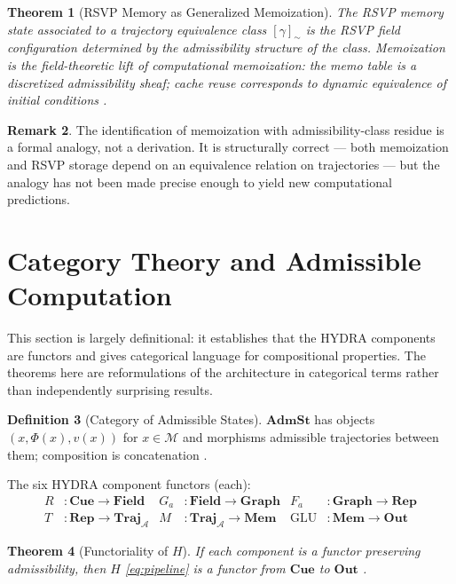 \documentclass[12pt, a4paper]{article}
\theoremstyle{rsvpstyle}
\newtheorem{theorem}{Theorem}[section]
\theoremstyle{definition}
\newtheorem{definition}[theorem]{Definition}
\newtheorem{remark}[theorem]{Remark}
\newcommand{\OpMan}{\mathcal{M}}
\newcommand{\Adm}{\mathcal{A}}
\begin{document}
\begin{theorem}[RSVP Memory as Generalized Memoization]
The RSVP memory state associated to a trajectory equivalence class $[\gamma]_\sim$
is the RSVP field configuration determined by the admissibility structure of
the class. Memoization is the field-theoretic lift of computational memoization:
the memo table is a discretized admissibility sheaf; cache reuse corresponds
to dynamic equivalence of initial conditions \citep{Bellman1957}.
\end{theorem}

\begin{remark}
The identification of memoization with admissibility-class
residue is a formal analogy, not a derivation. It is structurally correct ---
both memoization and RSVP storage depend on an equivalence relation on
trajectories --- but the analogy has not been made precise enough to yield
new computational predictions.
\end{remark}

\section{Category Theory and Admissible Computation}

This section is largely definitional: it establishes that the HYDRA components
are functors and gives categorical language for compositional properties.
The theorems here are reformulations of the architecture in categorical terms
rather than independently surprising results.

\begin{definition}[Category of Admissible States]
$\mathbf{AdmSt}$ has objects $(x, \Phi(x), v(x))$ for $x \in \OpMan$ and
morphisms admissible trajectories between them; composition is concatenation
\citep{MacLane1998}.
\end{definition}

The six HYDRA component functors (each):
\begin{align*}
  R &: \mathbf{Cue} \to \mathbf{Field} & G_a &: \mathbf{Field} \to \mathbf{Graph} &
  F_a &: \mathbf{Graph} \to \mathbf{Rep}\\
  T &: \mathbf{Rep} \to \mathbf{Traj}_\Adm &
  M &: \mathbf{Traj}_\Adm \to \mathbf{Mem} &
  \mathrm{GLU} &: \mathbf{Mem} \to \mathbf{Out}
\end{align*}

\begin{theorem}[Functoriality of $H$]
\label{thm:functor}
If each component is a functor preserving admissibility, then $H$ \eqref{eq:pipeline}
is a functor from $\mathbf{Cue}$ to $\mathbf{Out}$ \citep{MacLane1998}.
\end{theorem}
\end{document}

